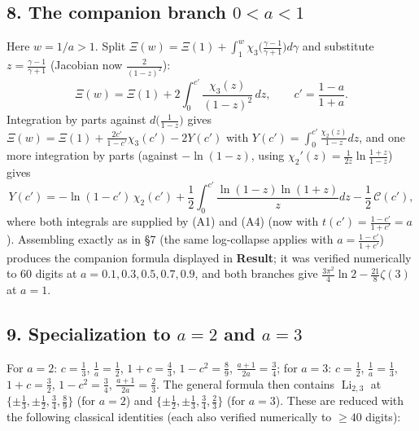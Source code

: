 \documentclass[11pt]{article}
\theoremstyle{remark}
\begin{document}
\subsection*{8. The companion branch $0<a<1$}

Here $w=1/a>1$. Split $\Xi(w)=\Xi(1)+\int_1^w\chi_3\bigl(\frac{\gamma-1}{\gamma+1}\bigr)d\gamma$ and substitute $z=\frac{\gamma-1}{\gamma+1}$ (Jacobian now $\frac{2}{(1-z)^2}$):
\[\Xi(w)=\Xi(1)+2\int_0^{c'}\frac{\chi_3(z)}{(1-z)^2}\,dz,\qquad c'=\frac{1-a}{1+a}.\]
Integration by parts against $d\bigl(\frac{1}{1-z}\bigr)$ gives
$\Xi(w)=\Xi(1)+\frac{2c'}{1-c'}\chi_3(c')-2Y(c')$ with $Y(c')=\int_0^{c'}\frac{\chi_2(z)}{1-z}dz$, and one more integration by parts (against $-\ln(1-z)$, using $\chi_2'(z)=\frac{1}{2z}\ln\frac{1+z}{1-z}$) gives
\[Y(c')=-\ln(1-c')\,\chi_2(c')+\frac12\int_0^{c'}\frac{\ln(1-z)\ln(1+z)}{z}dz-\frac12\,\mathcal C(c'),\]
where both integrals are supplied by (A1) and (A4) (now with $t(c')=\frac{1-c'}{1+c'}=a$). Assembling exactly as in \S7 (the same log-collapse applies with $a=\frac{1-c'}{1+c'}$) produces the companion formula displayed in \textbf{Result}; it was verified numerically to 60 digits at $a=0.1,0.3,0.5,0.7,0.9$, and both branches give $\frac{3\pi^2}{4}\ln2-\frac{21}{8}\zeta(3)$ at $a=1$.

\subsection*{9. Specialization to $a=2$ and $a=3$}

For $a=2$: $c=\frac13$, $\frac1a=\frac12$, $1+c=\frac43$, $1-c^2=\frac89$, $\frac{a+1}{2a}=\frac34$; for $a=3$: $c=\frac12$, $\frac1a=\frac13$, $1+c=\frac32$, $1-c^2=\frac34$, $\frac{a+1}{2a}=\frac23$. The general formula then contains $\operatorname{Li}_{2,3}$ at
$\{\pm\frac13,\pm\frac12,\frac34,\frac89\}$ (for $a=2$) and $\{\pm\frac12,\pm\frac13,\frac34,\frac23\}$ (for $a=3$). These are reduced with the following classical identities (each also verified numerically to $\ge40$ digits):
\end{document}
